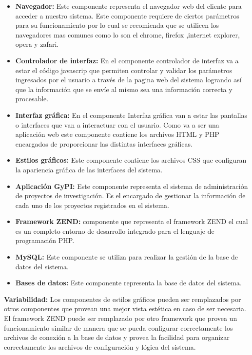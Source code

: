 \documentclass[12pt,oneside,letterpaper]{report}
\begin{document}
\begin{itemize}
 \item \textbf{Navegador:} Este componente representa el navegador web del cliente para acceder a nuestro sistema. Este componente requiere de ciertos parámetros para su funcionamiento por lo cual se recomienda que se utilicen los navegadores mas comunes como lo son el chrome, firefox ,internet explorer, opera y zafari.
 \item \textbf{Controlador de interfaz:} En el componente controlador de interfaz va a estar el código javascrip que permiten controlar y validar los parámetros ingresados por el usuario a través de la pagina web del sistema logrando así que la información que se envíe al mismo sea una información correcta y procesable.
 \item \textbf{Interfaz gráfica:} En el componente Interfaz gráfica van a estar las pantallas o interfaces que van a interactuar con el usuario. Como va a ser una aplicación web este componente contiene los archivos HTML y PHP encargados de proporcionar las distintas interfaces gráficas.
 \item \textbf{Estilos gráficos:} Este componente contiene los archivos CSS que configuran la apariencia gráfica de las interfaces del sistema.
 \item \textbf{Aplicación GyPI:} Este componente representa el sistema de administración de proyectos de investigación. Es el encargado de gestionar la información de cada uno de los proyectos registrados en el sistema.
 \item \textbf{Framework ZEND:} componente que representa el framework ZEND el cual es un completo entorno de desarrollo integrado para el lenguaje de programación PHP.
 \item \textbf{MySQL:} Este componente se utiliza para realizar la gestión de la base de datos del sistema.
 \item \textbf{Bases de datos:} Este componente representa la base de datos del sistema.
\end{itemize}

\textbf{Variabilidad:}
Los componentes de estilos gráficos pueden ser remplazados por otros componentes que provean una mejor vista estética en caso de ser necesaria.\\
El framework ZEND  puede ser remplazado por otro framework que provea un funcionamiento similar de manera que se pueda configurar correctamente los archivos de conexión a la base de datos y provea la facilidad para organizar correctamente los archivos de configuración y lógica del sistema.\\
\end{document}
